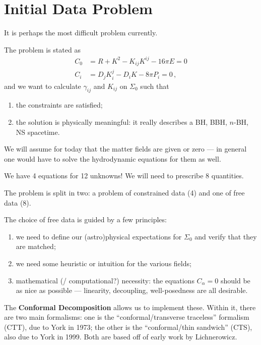 \documentclass[main.tex]{subfiles}
\begin{document}
\section{Initial Data Problem}


It is perhaps the most difficult problem currently. 

The problem is stated as 
%
\begin{align}
C_0 &= R + K^2 - K_{ij} K^{ij} - 16 \pi E = 0  \\
C_i &= D_j K^{j}_{i} - D_i K - 8 \pi P_i = 0
\,,
\end{align}
%
and we want to calculate \(\gamma_{ij}\) and \(K_{ij} \) on \(\Sigma _0\) such that 
\begin{enumerate}
    \item the constraints are satisfied;
    \item the solution is physically meaningful: it really describes a BH, BBH, \(n\)-BH, NS spacetime.
\end{enumerate}

We will assume for today that the matter fields are given or zero --- in general one would have to solve the hydrodynamic equations for them as well.

We have 4 equations for 12 unknowns!
We will need to prescribe 8 quantities.

The problem is split in two: a problem of constrained data (4)
and one of free data (8). 

The choice of free data is guided by a few principles: 
\begin{enumerate}
    \item we need to define our (astro)physical expectations for \(\Sigma_0 \) and verify that they are matched;
    \item we need some heuristic or intuition for the various fields;
    \item mathematical (/ computational?) necessity: the equations \(C_\alpha = 0\) should be as nice as possible --- linearity, decoupling, well-posedness are all desirable. 
\end{enumerate}

The \textbf{Conformal Decomposition} allows us to implement these. 
Within it, there are two main formalisms: one is the ``conformal/transverse traceless'' formalism (CTT), due to York in 1973; the other is the ``conformal/thin sandwich'' (CTS), also due to York in 1999.
Both are based off of early work by Lichnerowicz. 
\end{document}
